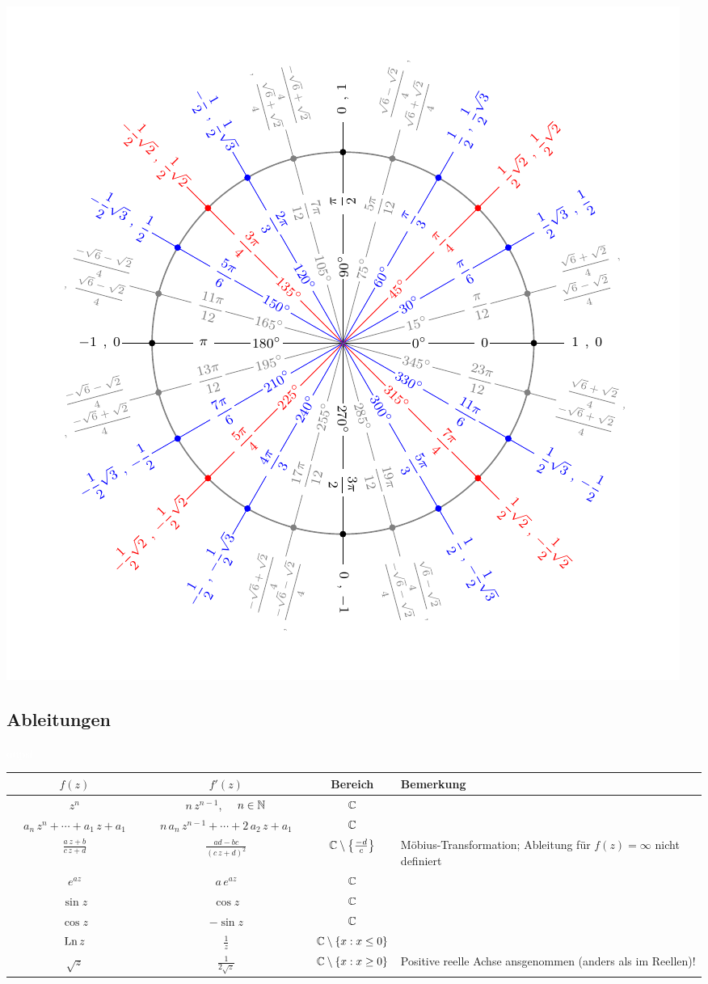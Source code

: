 \begin{minipage}{.9\textwidth}
  \qquad\qquad
  \includegraphics[width=\linewidth]{content/figures/einheitskreis_15}
\end{minipage}



\subsection{Ableitungen}
\textcolor{white}{dupsi}\\

\renewcommand{\arraystretch}{2.718281828}
\begin{tabular}{cccl}
  \toprule
  $f(z)$ & $f'(z)$ & Bereich & Bemerkung \\
  \midrule
  $z^n$ & $n \, z^{n-1}$, $\quad n\in\mathbb{N}$ & $\mathbb{C}$ & \\
  $\quad a_n \, z^n + \cdots + a_1 \, z + a_1 \quad$
   & $\quad n \, a_n \, z^{n-1} + \cdots + 2 \, a_2 \, z + a_1 \quad$
   & $\mathbb{C}$
   & \\
  $\displaystyle\frac{a \, z + b}{c \, z + d}$ & $\displaystyle\frac{ad -bc}{(c \, z + d)^2}$ & $\mathbb{C}\setminus\left\{\frac{-d}{c}\right\}$ & Möbius-Transformation; Ableitung für $f(z)=\infty$ nicht definiert \\
  $e^{az}$ & $a \, e^{az}$ & $\mathbb{C}$ & \\
  $\sin z$ & $\cos z$ & $\mathbb{C}$ & \\
  $\cos z$ & $-\sin z$ & $\mathbb{C}$ & \\
  $\operatorname{Ln} z$ & $\displaystyle\frac{1}{z}$ & $\mathbb{C} \setminus \{ x: x \leq 0 \}$ & \\
  $\sqrt{z}$ & $\displaystyle\frac{1}{2 \sqrt{z}}$ & $\mathbb{C} \setminus \{ x: x \geq 0 \}$ & Positive reelle Achse ansgenommen (anders als im Reellen)! \\
  \bottomrule
\end{tabular}
\renewcommand{\arraystretch}{1}
